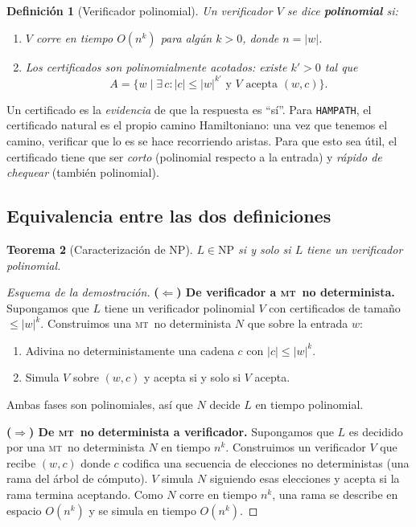\documentclass[11pt,a4paper]{article}
\theoremstyle{definicion}
\newtheorem{definicion}{Definición}[section]
\newtheorem{teorema}[definicion]{Teorema}
\newcommand{\MT}{\textsc{mt}}
\newcommand{\NP}{\mathrm{NP}}
\begin{document}
\begin{definicion}[Verificador polinomial]
Un verificador $V$ se dice \textbf{polinomial} si:
\begin{enumerate}
    \item $V$ corre en tiempo $O(n^k)$ para algún $k > 0$, donde $n = |w|$.
    \item Los certificados son polinomialmente acotados: existe $k' > 0$ tal que
    \[
    A = \{ w \mid \exists\, c : |c| \leq |w|^{k'} \text{ y } V \text{ acepta } (w, c)\}.
    \]
\end{enumerate}
\end{definicion}

\begin{intuicion}
Un certificado es la \emph{evidencia} de que la respuesta es ``sí''. Para \texttt{HAMPATH}, el certificado natural es el propio camino Hamiltoniano: una vez que tenemos el camino, verificar que lo es se hace recorriendo aristas. Para que esto sea útil, el certificado tiene que ser \emph{corto} (polinomial respecto a la entrada) y \emph{rápido de chequear} (también polinomial).
\end{intuicion}

\subsection{Equivalencia entre las dos definiciones}

\begin{teorema}[Caracterización de $\NP$]\label{teo:equiv-np}
$L \in \NP$ si y solo si $L$ tiene un verificador polinomial.
\end{teorema}

\begin{proof}[Esquema de la demostración]
\textbf{($\Leftarrow$) De verificador a \MT\ no determinista.}\quad
Supongamos que $L$ tiene un verificador polinomial $V$ con certificados de tamaño $\leq |w|^k$. Construimos una \MT\ no determinista $N$ que sobre la entrada $w$:
\begin{enumerate}
    \item Adivina no deterministamente una cadena $c$ con $|c| \leq |w|^k$.
    \item Simula $V$ sobre $(w, c)$ y acepta si y solo si $V$ acepta.
\end{enumerate}
Ambas fases son polinomiales, así que $N$ decide $L$ en tiempo polinomial.

\textbf{($\Rightarrow$) De \MT\ no determinista a verificador.}\quad
Supongamos que $L$ es decidido por una \MT\ no determinista $N$ en tiempo $n^k$. Construimos un verificador $V$ que recibe $(w, c)$ donde $c$ codifica una secuencia de elecciones no deterministas (una rama del árbol de cómputo). $V$ simula $N$ siguiendo esas elecciones y acepta si la rama termina aceptando. Como $N$ corre en tiempo $n^k$, una rama se describe en espacio $O(n^k)$ y se simula en tiempo $O(n^k)$.
\end{proof}
\end{document}

